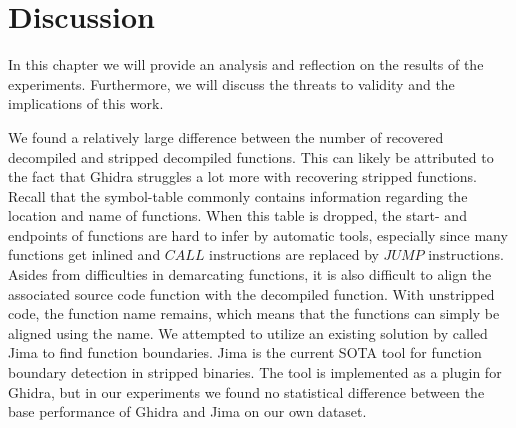 \chapter{Discussion}
\label{discussion}
In this chapter we will provide an analysis and reflection on the results of the experiments. Furthermore, we will discuss the threats to validity and the implications of this work.

We found a relatively large difference between the number of recovered decompiled and stripped decompiled functions. This can likely be attributed to the fact that Ghidra struggles a lot more with recovering stripped functions. Recall that the symbol-table commonly contains information regarding the location and name of functions. When this table is dropped, the start- and endpoints of functions are hard to infer by automatic tools, especially since many functions get inlined and \(CALL\) instructions are replaced by \(JUMP\) instructions. Asides from difficulties in demarcating functions, it is also difficult to align the associated source code function with the decompiled function. With unstripped code, the function name remains, which means that the functions can simply be aligned using the name. We attempted to utilize an existing solution by \citeauthor{FunctionBoundaryDetection} called Jima \cite{FunctionBoundaryDetection} to find function boundaries. Jima is the current SOTA tool for function boundary detection in stripped binaries. The tool is implemented as a plugin for Ghidra, but in our experiments we found no statistical difference between the base performance of Ghidra and Jima on our own dataset.

